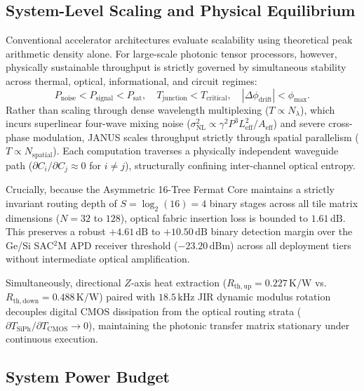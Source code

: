 \documentclass[journal]{IEEEtran}
\begin{document}
\subsection{\textbf{System-Level Scaling and Physical Equilibrium}}

Conventional accelerator architectures evaluate scalability using theoretical peak arithmetic density alone. For large-scale photonic tensor processors, however, physically sustainable throughput is strictly governed by simultaneous stability across thermal, optical, informational, and circuit regimes:
\begin{equation}
P_{\mathrm{noise}} < P_{\mathrm{signal}} < P_{\mathrm{sat}}, \quad T_{\mathrm{junction}} < T_{\mathrm{critical}}, \quad |\Delta\phi_{\mathrm{drift}}| < \phi_{\mathrm{max}}.
\end{equation}
Rather than scaling through dense wavelength multiplexing ($T \propto N_\lambda$), which incurs superlinear four-wave mixing noise ($\sigma_{\mathrm{NL}}^2 \propto \gamma^2 P^3 L_{\mathrm{eff}}^2 / A_{\mathrm{eff}}$) and severe cross-phase modulation, JANUS scales throughput strictly through spatial parallelism ($T \propto N_{\mathrm{spatial}}$). Each computation traverses a physically independent waveguide path ($\partial C_i / \partial C_j \approx 0$ for $i \neq j$), structurally confining inter-channel optical entropy.

Crucially, because the Asymmetric 16-Tree Fermat Core maintains a strictly invariant routing depth of $S = \log_2(16) = 4$ binary stages across all tile matrix dimensions ($N = 32$ to $128$), optical fabric insertion loss is bounded to $1.61\,\mathrm{dB}$. This preserves a robust $+4.61\,\mathrm{dB}$ to $+10.50\,\mathrm{dB}$ binary detection margin over the Ge/Si SAC$^2$M APD receiver threshold ($-23.20\,\mathrm{dBm}$) across all deployment tiers without intermediate optical amplification. 

Simultaneously, directional $Z$-axis heat extraction ($R_{\mathrm{th,up}} = 0.227\,\mathrm{K/W}$ vs. $R_{\mathrm{th,down}} = 0.488\,\mathrm{K/W}$) paired with $18.5\,\mathrm{kHz}$ JIR dynamic modulus rotation decouples digital CMOS dissipation from the optical routing strata ($\partial T_{\mathrm{SiPh}} / \partial T_{\mathrm{CMOS}} \to 0$), maintaining the photonic transfer matrix stationary under continuous execution.

\subsection{\textbf{System Power Budget}}
\end{document}

